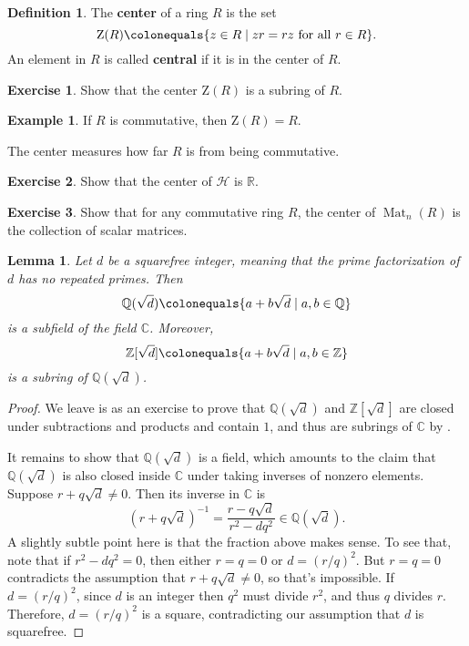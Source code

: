\documentclass[12pt]{report}
\newtheorem{lemma}[theorem]{Lemma}
\numberwithin{equation}{section}
\numberwithin{theorem}{chapter}
\theoremstyle{definition}
\newtheorem{definition}[theorem]{Definition}
\newtheorem{example}[theorem]{Example}
\newtheorem{exercise}{Exercise}
\newtheorem*{basic properties}{Basic Properties}
\newtheorem*{Important Remark}{Important Remark}
\newcommand{\C}{\mathbb{C}}
\DeclareMathOperator{\Mat}{Mat}
\begin{document}
\begin{definition}
The {\bf center} of a ring $R$ is the set
$$\mathrm{Z}(R) \colonequals \{z \in R \mid zr = rz \text{ for all } r \in R\}.$$
An element in $R$ is called {\bf central} if it is in the center of $R$.
\end{definition}

\begin{exercise}
Show that the center $\mathrm{Z}(R)$ is a subring of $R$.
\end{exercise}


\begin{example}
	If $R$ is commutative, then $\mathrm{Z}(R) = R$.
\end{example}

The center measures how far $R$ is from being commutative.

\begin{exercise} 
Show that the center of $\mathcal{H}$ is $\mathbb{R}$.	
\end{exercise}

\begin{exercise}
Show that for any commutative ring $R$, the center of $\Mat_{n}(R)$ is the collection of scalar matrices.
\end{exercise}



\begin{lemma}\label{Z sqrt d}
Let $d$ be a squarefree integer, meaning that the prime factorization of $d$ has no repeated primes. Then 
$$\mathbb{Q}(\sqrt {d}) \colonequals \{a + b\sqrt{d} \mid a,b \in \mathbb{Q}\}$$ 
is a subfield of the field $\C$. Moreover, 
$$\mathbb{Z}[\sqrt{d}] \colonequals \{a + b\sqrt{d} \mid a,b \in \mathbb{Z}\}$$ 
is a subring of $\mathbb{Q}(\sqrt{d})$. 
\end{lemma}


\begin{proof} 
We leave is as an exercise to prove that $\mathbb{Q}(\sqrt {d})$ and $\mathbb{Z}[\sqrt{d}]$ are closed under subtractions and products and contain $1$, and thus are subrings of $\C$ by .

It remains to show that $\mathbb{Q}(\sqrt {d})$ is a field, which amounts to the claim that $\mathbb{Q}(\sqrt {d})$ is also closed inside $\C$ under taking inverses of nonzero elements.
Suppose  $r + q \sqrt{d} \ne 0$. Then its inverse in $\C$ is
$$(r + q \sqrt{d})^{-1} = \frac{r - q \sqrt{d}}{r^2 - d q^2} \in \mathbb{Q}(\sqrt {d}).$$
A slightly subtle point here is that the fraction above makes sense. To see that, note that if $r^2 -d q^2 = 0$, then either $r=q=0$ or $d=(r/q)^2$. But $r=q=0$ contradicts the assumption that $r + q \sqrt{d} \neq 0$, so that's impossible. If $d=(r/q)^2$, since $d$ is an integer then $q^2$ must divide $r^2$, and thus $q$ divides $r$. Therefore, $d = (r/q)^2$ is a square, contradicting our assumption that $d$ is squarefree.
\end{proof}
\end{document}
